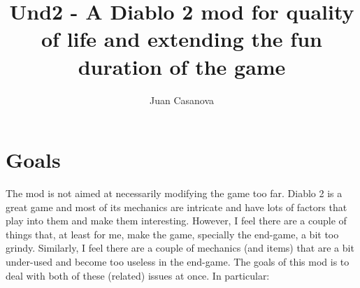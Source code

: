 \documentclass[12pt,a4paper]{article}
\title{Und2 - A Diablo 2 mod for quality of life and extending the fun duration of the game}
\author{Juan Casanova}
\begin{document}
\maketitle

\tableofcontents

\section{Goals}

The mod is not aimed at necessarily modifying the game too far. Diablo 2 is a great game and most of its mechanics are intricate and have lots of factors that play into them and make them interesting. However, I feel there are a couple of things that, at least for me, make the game, specially the end-game, a bit too grindy. Similarly, I feel there are a couple of mechanics (and items) that are a bit under-used and become too useless in the end-game. The goals of this mod is to deal with both of these (related) issues at once. In particular:
\end{document}
